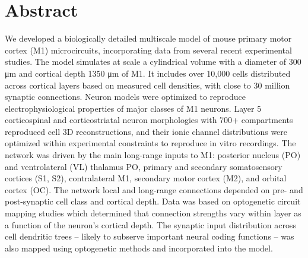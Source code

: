 \section*{Abstract}
We developed a biologically detailed multiscale model of mouse primary motor cortex (M1) microcircuits, incorporating data from several recent experimental studies. The model simulates at scale a cylindrical volume with a diameter of 300 μm and cortical depth 1350 μm of M1. It includes over 10,000 cells distributed across cortical layers based on measured cell densities, with close to 30 million synaptic connections. Neuron models were optimized to reproduce electrophysiological properties of  major classes of M1 neurons. Layer 5 corticospinal and corticostriatal neuron morphologies with 700+ compartments reproduced cell 3D reconstructions, and their ionic channel distributions were optimized within experimental constraints to reproduce in vitro recordings. The network was driven by the main long-range inputs to M1: posterior nucleus (PO) and ventrolateral (VL) thalamus PO, primary and secondary somatosensory cortices (S1, S2), contralateral M1, secondary motor cortex (M2), and orbital cortex (OC). The network local and long-range connections depended on pre- and post-synaptic cell class and cortical depth. Data was based on optogenetic circuit mapping studies which determined that connection strengths vary within layer as a function of the neuron's cortical depth. The synaptic input distribution across cell dendritic trees -- likely to subserve important neural coding functions -- was also mapped using optogenetic methods and incorporated into the model. 
